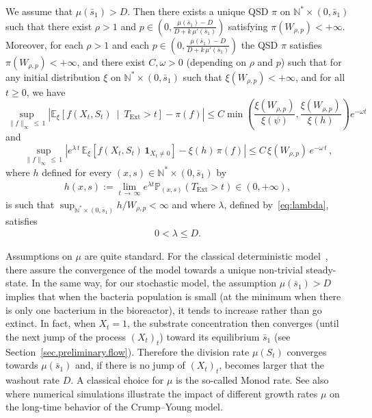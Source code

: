 \documentclass[AHL,Unicode,longabstracts,published]{cedram}
\newcommand{\PP}{\mathbb{P}}
\newcommand{\NN}{\mathbb{N}}
\newcommand{\EE}{\mathbb{E}}
\newcommand{\X}{\NN^* \times (0,\bar s_1)}
\newcommand{\Text}{T_{\mathrm{Ext}}}
\newcommand{\1}{\mathbf{1}}
\begin{document}
\begin{theo}\label{th:main-qsd}
We assume that $\mu(\bar s_1)>D$. Then there exists a unique QSD $\pi$ on $\NN^*\times (0,\bar s_1)$ such that there exist $\rho>1$ and $p\in(0,\frac{\mu(\bar s_1)-D}{D+k\,\mu'(\bar s_1)})$ satisfying $\pi(W_{\rho,p})<+\infty$. Moreover, for each $\rho>1$ and each $p\in(0,\frac{\mu(\bar s_1)-D}{D+k\,\mu'(\bar s_1)})$ the QSD $\pi$ satisfies $\pi(W_{\rho,p})<+\infty$, and there exist $C,\omega>0$ (depending on $\rho$ and $p$) such that for any initial distribution $\xi$ on $\NN^*\times (0, \bar s_1)$ such that $\xi(W_{\rho,p})<+\infty$, and for all $t\geq 0$, we have
\begin{equation}\label{eq:cv_qsd}
\sup_{\|f \|_\infty\,\leq\,1 } \left|\EE_\xi \left[f(X_t,S_t) \ \middle| \ \Text>t\right] - \pi(f) \right| \leq C \min\left(\frac{\xi\left(W_{\rho,p}\right)}{\xi(\psi)}, \frac{\xi\left(W_{\rho,p}\right)}{\xi(h)} \right) e^{-\omega t}
\end{equation}
and
\begin{equation}\label{eq:cv_qsd_X_eq_h}
\sup_{\|f \|_\infty \,\leq\,1 } \left|e^{\lambda \,t}\,\EE_\xi\left[f(X_t,S_t)\,\1_{X_t\neq 0}\right]-\xi(h)\,\pi(f)\right|\leq C\,\xi\left(W_{\rho,p}\right)\,e^{-\omega\,t}\,,
\end{equation}
where $h$ defined for every $(x,s) \in \NN^*\times(0, \bar s_1)$ by
\begin{align}\label{def:h}
h(x,s) := \lim_{t\,\to\,\infty} e^{\lambda t}\PP_{(x,s)} (\Text>t)\in (0,+\infty),
\end{align}
is such that $\sup_{\X}h/W_{\rho,p}<\infty$ and where $\lambda$, defined by~\eqref{eq:lambda}, satisfies
\begin{align}\label{eq:eigenvalue.bounds}
0< \lambda \leq D.
\end{align}
\end{theo}


Assumptions on $\mu$ are quite standard. For the classical deterministic model~\cite{SW95}, there assure the convergence of the model towards a unique non-trivial steady-state. In the same way, for our stochastic model, the assumption $\mu(\bar s_1)>D$ implies that when the bacteria population is small (at the minimum when there is only one bacterium in the bioreactor), it tends to increase rather than go extinct. In fact, when $X_t=1$, the substrate concentration then converges (until the next jump of the process $(X_t)_t$) toward its equilibrium $\bar s_1$ (see Section~\ref{sec.preliminary.flow}). Therefore the division rate $\mu(S_t)$ converges towards $\mu(\bar s_1)$ and, if there is no jump of $(X_t)_t$, becomes larger that the washout rate $D$. A classical choice for $\mu$ is the so-called Monod rate. See also~\cite{CF17} where numerical simulations illustrate the impact of different growth rates $\mu$ on the long-time behavior of the Crump--Young model.
\end{document}
